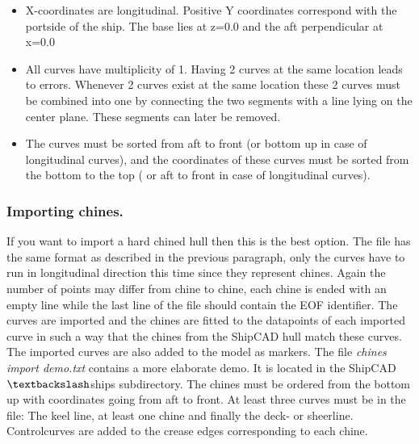 \documentclass[12pt]{article}
\begin{document}
\begin{itemize}

  \item X-coordinates are longitudinal.  Positive Y coordinates
correspond with the portside of the ship. The base lies at z=0.0 and
the aft perpendicular at x=0.0

  \item All curves have multiplicity of 1. Having 2 curves at the same
location leads to errors.  Whenever 2 curves exist at the same
location these 2 curves must be combined into one by connecting the
two segments with a line lying on the center plane. These segments can
later be removed.

  \item The curves must be sorted from aft to front (or bottom up in
case of longitudinal curves), and the coordinates of these curves must
be sorted from the bottom to the top ( or aft to front in case of
longitudinal curves).

\end{itemize}

\subsubsection{Importing chines.}
If you want to import a hard chined hull then this is the best
option. The file has the same format as described in the previous
paragraph, only the curves have to run in longitudinal direction this
time since they represent chines. Again the number of points may
differ from chine to chine, each chine is ended with an empty line
while the last line of the file should contain the EOF identifier.
The curves are imported and the chines are fitted to the datapoints of
each imported curve in such a way that the chines from the ShipCAD
hull match these curves.  The imported curves are also added to the
model as markers. The file \textit{chines import demo.txt} contains a
more elaborate demo. It is located in the ShipCAD$\textbackslash$ships
subdirectory. The chines must be ordered from the bottom up with
coordinates going from aft to front. At least three curves must be in
the file: The keel line, at least one chine and finally the deck- or
sheerline. Controlcurves are added to the crease edges corresponding
to each chine.
\end{document}
